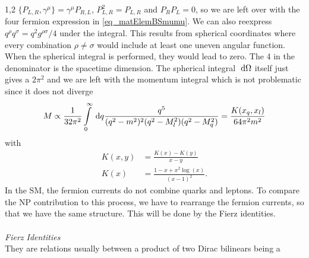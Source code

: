 \documentclass[11pt,a4paper,twoside]{article}
\numberwithin{equation}{section}
\begin{document}
\begin{spacing}{1,2}
$\{P_{L,R},\gamma^\mu\} = \gamma^\mu P_{R,L}$, $P_{L,R}^2 = P_{L,R}$ and $P_R P_L = 0$, so we are left over with the four fermion expression in 
\eqref{eq_matElemBSmumu}. We can also reexpress $q^\rho q^\sigma = q^2 g^{\rho\sigma}/4$ under the integral. This results from spherical coordinates where
every combination $\rho\neq\sigma$ would include at least one uneven angular function. When the spherical integral is performed, they would lead to zero. The 
4 in the denominator is the spacetime dimension. The spherical integral $\; \mathrm{d} \Omega$ itself just gives a $2\pi^2$ and we are left with the momentum integral
which is not problematic since it does not diverge
\begin{align}
 M \propto \frac{1}{32\pi^2} \int\limits_0^\infty \; \mathrm{d} q \frac{q^5}{(q^2-m^2)^2(q^2-M_l^2)(q^2-M_q^2)} = \frac{K(x_q,x_l)}{64\pi^2 m^2}
\end{align}
with
\begin{align}
 K(x,y) &= \frac{K(x)-K(y)}{x-y}\\
 K(x)&=\frac{1-x+x^2\log(x)}{(x-1)^2}.
\end{align}
In the SM, the fermion currents do not combine quarks and leptons. To compare the NP contribution to this process, we have to rearrange the fermion currents,
so that we have the same structure. This will be done by the Fierz identities.
\\ \\ \noindent \textit{Fierz Identities}\\
They are relations usually between a product of two Dirac bilinears being a 


\end{spacing}
\end{document}
